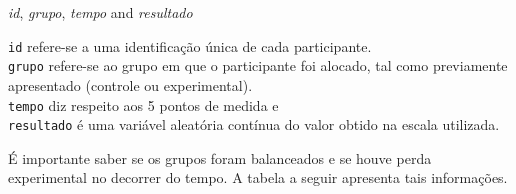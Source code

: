 \documentclass[
]{book}
\newenvironment{Shaded}{\begin{snugshade}}{\end{snugshade}}
\newcommand{\KeywordTok}[1]{\textcolor[rgb]{0.13,0.29,0.53}{\textbf{#1}}}
\newcommand{\NormalTok}[1]{#1}
\newcommand{\OperatorTok}[1]{\textcolor[rgb]{0.81,0.36,0.00}{\textbf{#1}}}
\newcommand{\StringTok}[1]{\textcolor[rgb]{0.31,0.60,0.02}{#1}}
\begin{document}
\emph{id}, \emph{grupo}, \emph{tempo} and \emph{resultado}

\texttt{id} refere-se a uma identificação única de cada participante.\\
\texttt{grupo} refere-se ao grupo em que o participante foi alocado, tal como previamente apresentado (controle ou experimental).\\
\texttt{tempo} diz respeito aos 5 pontos de medida e\\
\texttt{resultado} é uma variável aleatória contínua do valor obtido na escala utilizada.

É importante saber se os grupos foram balanceados e se houve perda experimental no decorrer do tempo. A tabela a seguir apresenta tais informações.

\begin{Shaded}
\end{Shaded}
\end{document}
